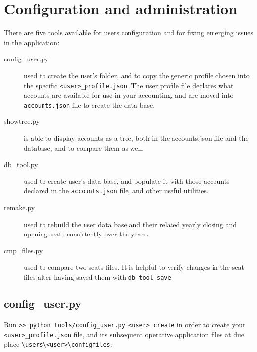 \documentclass[12pt, a4paper]{article}
\begin{document}
 
 \section{Configuration and administration }\label{conf_admin_sec}
 There are five  tools available for users configuration and for fixing emerging issues in the application:
 
 \begin{description}
 \item[config\_user.py] used to create the user's folder, and to copy the generic profile chosen into the specific \verb!<user>_profile.json!.
   The user profile file declares what accounts are available for use in your accounting, and are moved into \verb!accounts.json! file to create the data base.
 \item[showtree.py] is able to display accounts as a tree, both in the accounts.json file and the database, and to compare them as well.
 \item[db\_tool.py] used to create user's data base, and populate it with those accounts declared in the \verb!accounts.json! file, and other useful utilities.
  \item[remake.py] used to rebuild the user data base and their  related yearly closing and opening seats consistently over the years. 
 \item[cmp\_files.py] used to compare two seats files. It is helpful to verify changes in the seat files after having saved them with \verb!db_tool save!
 \end{description}
 
 \subsection{config\_user.py}
 Run \verb!>> python tools/config_user.py <user> create! in order to create your \verb!<user>_profile.json! file, and its subsequent  operative application files at due place 
 \verb!\users\<user>\configfiles!:
\begin{figure}[h]
\centering
{}
 \end{figure}
  
\end{document}
